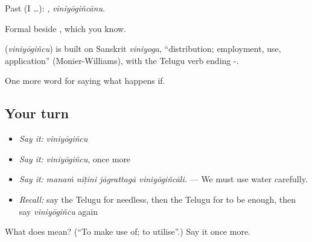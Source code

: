 Past (I …): , \emph{viniyōgiñcānu}.

Formal beside , which you know.

\begin{cousinweb}
\textbf{} (\emph{viniyōgiñcu}) is built on Sanskrit \emph{viniyoga}, \textquotedblleft{}distribution; employment, use, application\textquotedblright{} (Monier-Williams), with the Telugu verb ending -.
\end{cousinweb}

\begin{grammarlens}[title={What you've built}]
One more word for saying what happens if.
\end{grammarlens}

\subsection*{Your turn}
\begin{itemize}
\raggedright
  \item \emph{Say it:} \emph{viniyōgiñcu}
  \item \emph{Say it:} \emph{viniyōgiñcu}, once more
  \item \emph{Say it:} \emph{manaṁ nīṭini jāgrattagā viniyōgiñcāli.} — We must use water carefully.
  \item \emph{Recall:} say the Telugu for needless, then the Telugu for to be enough, then say \emph{viniyōgiñcu} again
\end{itemize}

\begin{tcolorbox}[breakable,colback=teal!4,colframe=teal!35!black,title={Before you move on}]
What does  mean? (\textquotedblleft{}To make use of; to utilise\textquotedblright{}.) Say it once more.
\end{tcolorbox}
